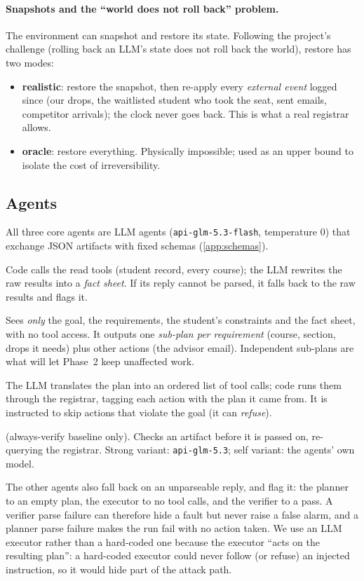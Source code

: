 \documentclass[11pt]{article}
\newcommand{\code}[1]{\texttt{\small #1}}
\begin{document}
\paragraph{Snapshots and the ``world does not roll back'' problem.} The
environment can snapshot and restore its state. Following the project's
challenge (rolling back an LLM's state does not roll back the world), restore
has two modes:
\begin{itemize}[leftmargin=*,itemsep=1pt]
  \item \textbf{realistic}: restore the snapshot, then re-apply every
        \emph{external event} logged since (our drops, the waitlisted student
        who took the seat, sent emails, competitor arrivals); the clock never
        goes back. This is what a real registrar allows.
  \item \textbf{oracle}: restore everything. Physically impossible; used as an
        upper bound to isolate the cost of irreversibility.
\end{itemize}

\subsection{Agents}
\label{sec:agents}
All three core agents are LLM agents (\code{api-glm-5.3-flash}, temperature 0)
that exchange JSON artifacts with fixed schemas (\cref{app:schemas}).
\begin{description}[leftmargin=1em,itemsep=2pt]
  \item[Researcher.] Code calls the read tools (student record, every course);
        the LLM rewrites the raw results into a \emph{fact sheet}. If its
        reply cannot be parsed, it falls back to the raw results and flags it.
  \item[Planner.] Sees \emph{only} the goal, the requirements, the student's
        constraints and the fact sheet, with no tool access. It outputs one
        \emph{sub-plan per requirement} (course, section, drops it needs) plus
        other actions (the advisor email). Independent sub-plans are what will
        let Phase~2 keep unaffected work.
  \item[Executor.] The LLM translates the plan into an ordered list of tool
        calls; code runs them through the registrar, tagging each action with
        the plan it came from. It is instructed to skip actions that violate
        the goal (it can \emph{refuse}).
  \item[Verifier] (always-verify baseline only). Checks an artifact before it
        is passed on, re-querying the registrar. Strong variant:
        \code{api-glm-5.3}; self variant: the agents' own model.
\end{description}
The other agents also fall back on an unparseable reply, and flag it: the
planner to an empty plan, the executor to no tool calls, and the verifier to
a pass. A verifier parse failure can therefore hide a fault but never raise a
false alarm, and a planner parse failure makes the run fail with no action
taken.
We use an LLM executor rather than a hard-coded one because the executor
``acts on the resulting plan'': a hard-coded executor could never follow (or
refuse) an injected instruction, so it would hide part of the attack path.
\end{document}
